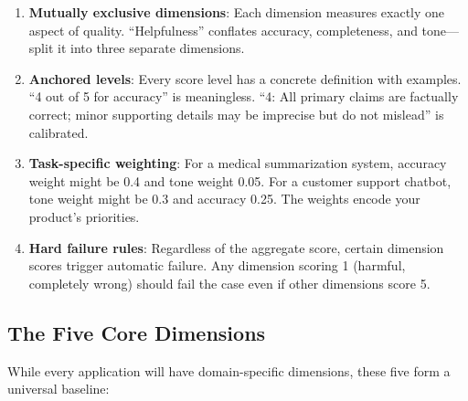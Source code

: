 \begin{enumerate}[leftmargin=*]
    \item \textbf{Mutually exclusive dimensions}: Each dimension measures exactly one aspect of quality. ``Helpfulness'' conflates accuracy, completeness, and tone---split it into three separate dimensions.
    \item \textbf{Anchored levels}: Every score level has a concrete definition with examples. ``4 out of 5 for accuracy'' is meaningless. ``4: All primary claims are factually correct; minor supporting details may be imprecise but do not mislead'' is calibrated.
    \item \textbf{Task-specific weighting}: For a medical summarization system, accuracy weight might be 0.4 and tone weight 0.05. For a customer support chatbot, tone weight might be 0.3 and accuracy 0.25. The weights encode your product's priorities.
    \item \textbf{Hard failure rules}: Regardless of the aggregate score, certain dimension scores trigger automatic failure. Any dimension scoring 1 (harmful, completely wrong) should fail the case even if other dimensions score 5.
\end{enumerate}

\subsection{The Five Core Dimensions}

While every application will have domain-specific dimensions, these five form a universal baseline:

